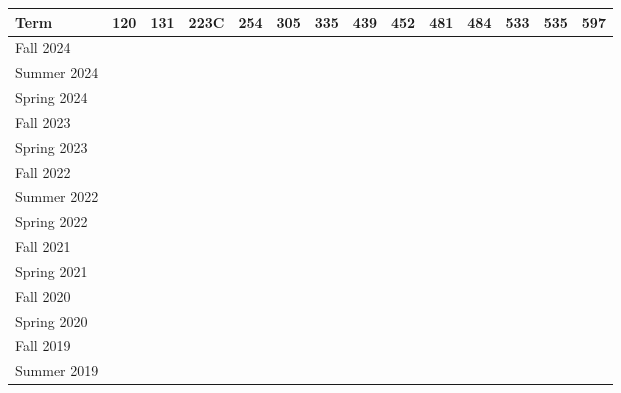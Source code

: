 \documentclass[11pt]{letter}
\newcommand{\ck}{\checkmark}
\begin{document}
  \begin{tabular}{|l|c|c|c|c|c|c|c|c|c|c|c|c|c|}
  \hline
  \textbf{Term} &
  \textbf{120} &
  \textbf{131} &
  \textbf{223C} &
  \textbf{254} &
  \textbf{305} &
  \textbf{335} &
  \textbf{439} &
  \textbf{452} &
  \textbf{481} &
  \textbf{484} &
  \textbf{533} &
  \textbf{535} &
  \textbf{597} \\ \hline

  Fall   2024  &\ck &    &    &    &    &    &    &    &    &    &\ck &    &    \\ \hline
  Summer 2024  &    &    &    &    &    &\ck &    &    &    &    &    &    &    \\ \hline
  Spring 2024  &\ck &    &    &    &    &    &    &    &    &    &    &\ck &    \\ \hline
  Fall   2023  &\ck &    &    &    &    &    &    &    &    &    &    &    &    \\ \hline
  Spring 2023  &\ck &    &    &    &    &    &    &    &    &    &    &\ck &    \\ \hline
  Fall   2022  &\ck &    &    &    &    &      &    &    &    &    &    &   &    \\ \hline
  Summer 2022  &    &    &    &    &    &\ck   &    &    &    &    &    &   &    \\ \hline
  Spring 2022  &    &    &    &    &    &\ck   &    &    &    &    &    &   &    \\ \hline
  Fall   2021  &    &\ck &    &    &    &    &    &    &    &    &\ck &    &    \\ \hline
  Spring 2021  &    &    &    &    &    &\ck &\ck &    &    &    &    &    &    \\ \hline
  Fall   2020  &    &\ck &    &    &    &    &    &    &    &    &\ck &    &    \\ \hline
  Spring 2020  &\ck &    &    &    &    &    &    &    &    &\ck &    &    &    \\ \hline
  Fall   2019 &\ck &    &    &    &    &    &    &    &    &    &\ck &    &    \\ \hline
  Summer 2019 &    &    &    &    &    &\ck &    &    &    &    &    &    &    \\ \hline

\end{tabular}
\end{document}
